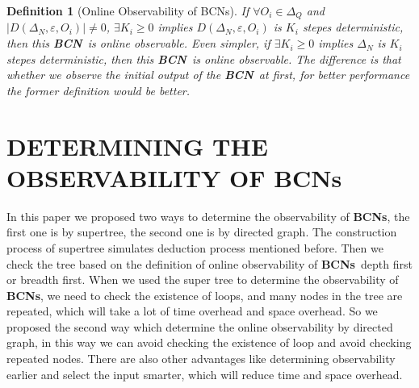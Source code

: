 \documentclass[letterpaper, 10 pt, conference]{ieeeconf}  %
\newtheorem{definition}{Definition}
\def \BCN {{\bf BCN}}
\def \BCNs {{\bf BCNs}}
\begin{document}
\begin{definition}[Online Observability of  BCNs]
If $\forall  O_i\in \Delta_Q$ and $|D\left(\Delta_N,\varepsilon, O_i\right)|\neq 0$, $\exists K_i \ge 0$ implies $D\left(\Delta_N,\varepsilon,O_i\right)$ is $K_i$ stepes deterministic, then this \BCN\ is online observable. Even simpler, if $\exists K_i \ge 0$ implies $\Delta_N$ is $K_i$ stepes deterministic, then this \BCN\ is online observable. The difference is that whether we observe the initial output of the \BCN\ at first, for better performance the former definition would be better.
\end{definition}

\section{DETERMINING THE OBSERVABILITY OF BCNs}

In this paper we proposed two ways to determine the observability of {\bf BCNs}, the first one is by supertree, the second one is by directed graph. The construction process of supertree simulates deduction process mentioned before. Then we check the tree based on the definition of online observability of \BCNs\ depth first or breadth first. When we used the super tree to determine the observability of {\bf BCNs}, we need to check the existence of loops, and many nodes in the tree are repeated, which will take a lot of time overhead and space overhead. So we proposed the second way which determine the online observability by directed graph,   in this way we can avoid checking the existence of loop and avoid checking repeated nodes. There are also other advantages like determining observability earlier and select the input smarter, which will reduce time and space overhead.    
\end{document}

